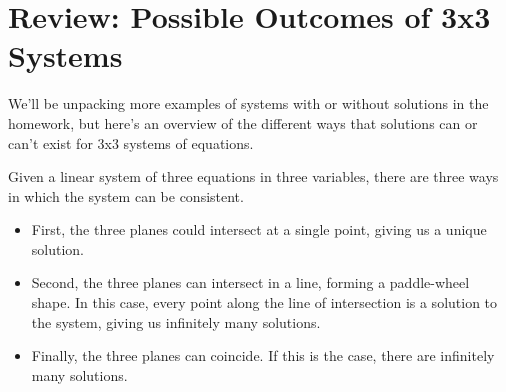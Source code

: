 \documentclass{ximera}
\begin{document}
\section*{Review: Possible Outcomes of 3x3 Systems}

We'll be unpacking more examples of systems with or without solutions in the homework, but here's an overview of the different ways that solutions can or can't exist for 3x3 systems of equations.

Given a linear system of three equations in three variables, there are three ways in which the system can be consistent.

\begin{itemize}
    \item First, the three planes could intersect at a single point, giving us a unique solution.
    \begin{center}
        \end{center}
    \item Second, the three planes can intersect in a line, forming a paddle-wheel shape.  In this case, every point along the line of intersection is a solution to the system, giving us infinitely many solutions.
        \begin{center}
            \end{center}
    \item Finally, the three planes can coincide.  If this is the case, there are infinitely many solutions.
        \begin{center}
        \end{center}
\end{itemize}
\end{document}
